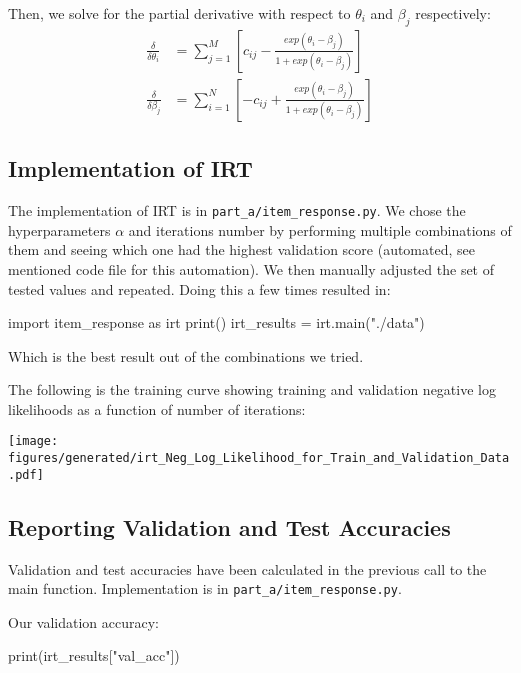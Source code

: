 \documentclass{article}
\begin{document}
    Then, we solve for the partial derivative with respect to $\theta_i$ and $\beta_j$ respectively:
    \begin{align*}
        \frac{\delta}{\delta\theta_{i}} &=  \sum_{j=1}^{M}{[c_{ij} - \frac{exp(\theta_{i} - \beta_{j})}{1+exp(\theta_{i} - \beta_{j})}]} \\
        \frac{\delta}{\delta\beta_{j}} &= \sum_{i=1}^{N}{[-c_{ij} + \frac{exp(\theta_{i} - \beta_{j})}{1+exp(\theta_{i} - \beta_{j})}]}
    \end{align*}
    
    \subsection{Implementation of IRT}
    The implementation of IRT is in \verb|part_a/item_response.py|. We chose the hyperparameters $\alpha$ and iterations number by performing multiple combinations of them and seeing which one had the highest validation score (automated, see mentioned code file for this automation). We then manually adjusted the set of tested values and repeated. Doing this a few times resulted in:

    \begin{pylabblock}[IRT]
        import item_response as irt
        print()
        irt_results = irt.main("./data")
    \end{pylabblock}
    \printpythontex[verb]

    Which is the best result out of the combinations we tried.

    The following is the training curve showing training and validation negative log likelihoods as a function of number of iterations:

    \texttt{[image: figures/generated/irt\_Neg\_Log\_Likelihood\_for\_Train\_and\_Validation\_Data.pdf]}

    \medskip

    \subsection{Reporting Validation and Test Accuracies}

    Validation and test accuracies have been calculated in the previous call to the main function. Implementation is in \verb|part_a/item_response.py|.

    \medskip

    \noindent
    Our validation accuracy:
    \begin{pylabblock}[IRT]
        print(irt_results["val_acc"])
    \end{pylabblock}
    \printpythontex[verb]
\end{document}
